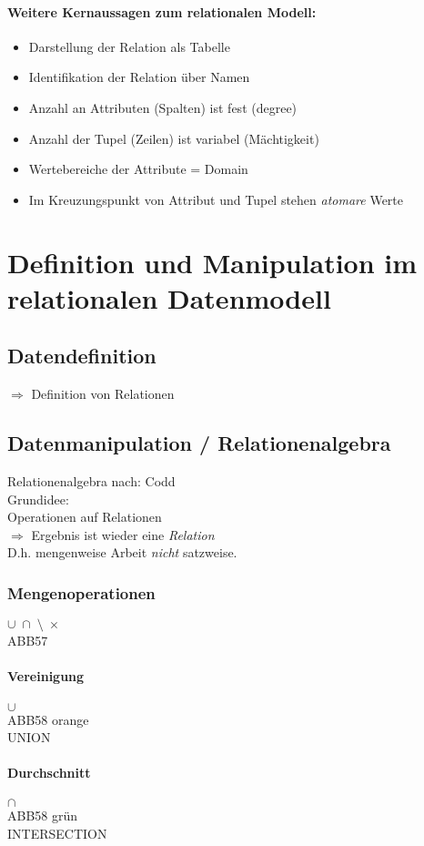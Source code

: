 \paragraph{Weitere Kernaussagen zum relationalen Modell:}
\begin{itemize}
\item Darstellung der Relation als Tabelle
\item Identifikation der Relation über Namen
\item Anzahl an Attributen (Spalten) ist fest (degree)
\item Anzahl der Tupel (Zeilen) ist variabel (Mächtigkeit)
\item Wertebereiche der Attribute = Domain
\item Im Kreuzungspunkt von Attribut und Tupel stehen \emph{atomare} Werte
\end{itemize}
\section{Definition und Manipulation im relationalen Datenmodell}
\subsection{Datendefinition}
$\Rightarrow$ Definition von Relationen
\subsection{Datenmanipulation / Relationenalgebra}
Relationenalgebra nach: Codd\\
Grundidee:\\
Operationen auf Relationen\\
$\Rightarrow$ Ergebnis ist wieder eine \emph{Relation}\\
D.h. mengenweise Arbeit \emph{nicht} satzweise.
\subsubsection{Mengenoperationen} $\cup\; \cap\; \setminus\; \times$\\
ABB57
\paragraph{Vereinigung} $\cup$\\
ABB58 orange\\
UNION
\paragraph{Durchschnitt} $\cap$\\
ABB58 grün\\
INTERSECTION
